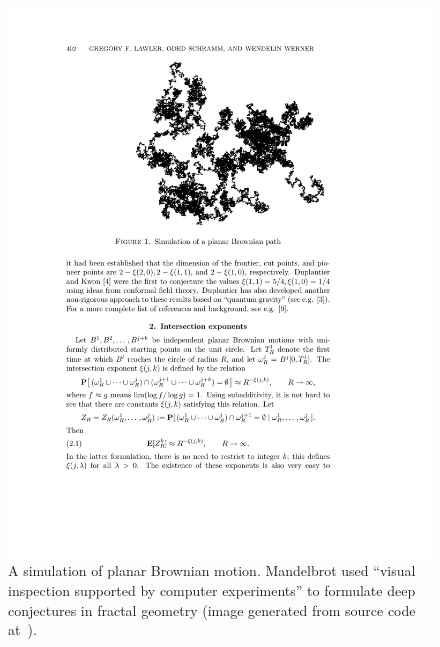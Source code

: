 \documentclass{llncs}
\begin{document}
\begin{figure}[h!]
  \centering
\includegraphics[scale=0.5]{brownian_motion.pdf}
  \caption{A simulation of planar Brownian motion. Mandelbrot used ``visual
inspection supported by computer experiments'' to formulate deep
conjectures in fractal geometry (image generated from source code at~\cite{LSW01}).}
\label{fig:4/3}
\end{figure}

\end{document}
